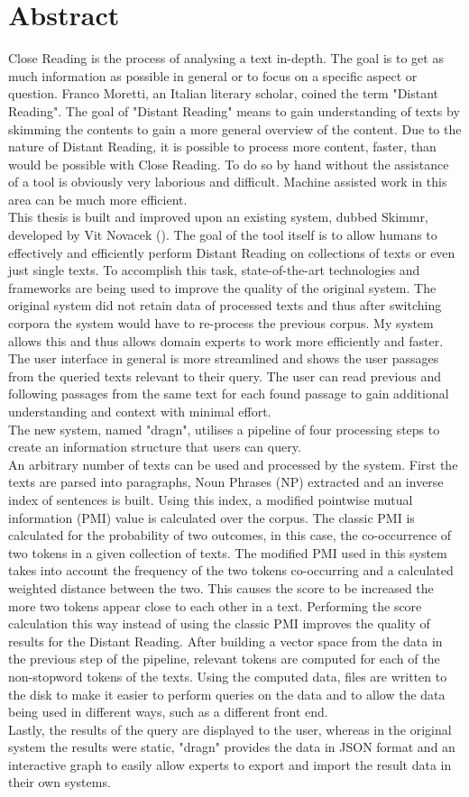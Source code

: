 \section*{Abstract}
Close Reading is the process of analysing a text in-depth. The goal is to get as much information as possible in general or to focus on a specific aspect or question. Franco Moretti, an Italian literary scholar, coined the term "Distant Reading". The goal of "Distant Reading" means to gain understanding of texts by skimming the contents to gain a more general overview of the content. Due to the nature of Distant Reading, it is possible to process more content, faster, than would be possible with Close Reading. To do so by hand without the assistance of a tool is obviously very laborious and difficult. Machine assisted work in this area can be much more efficient.\\
This thesis is built and improved upon an existing system, dubbed Skimmr, developed by Vit Novacek (\cite{novavcek2014skimmr}). The goal of the tool itself is to allow humans to effectively and efficiently perform Distant Reading on collections of texts or even just single texts. To accomplish this task, state-of-the-art technologies and frameworks are being used to improve the quality of the original system. The original system did not retain data of processed texts and thus after switching corpora the system would have to re-process the previous corpus. My system allows this and thus allows domain experts to work more efficiently and faster. The user interface in general is more streamlined and shows the user passages from the queried texts relevant to their query. The user can read previous and following passages from the same text for each found passage to gain additional understanding and context with minimal effort. \\
The new system, named "dragn", utilises a pipeline of four processing steps to create an information structure that users can query. \\
An arbitrary number of texts can be used and processed by the system. First the texts are parsed into paragraphs, Noun Phrases (NP) extracted and an inverse index of sentences is built. Using this index, a modified pointwise mutual information (PMI) value is calculated over the corpus. The classic PMI is calculated for the probability of two outcomes, in this case, the co-occurrence of two tokens in a given collection of texts. The modified PMI used in this system takes into account the frequency of the two tokens co-occurring and a calculated weighted distance between the two. This causes the score to be increased the more two tokens appear close to each other in a text. Performing the score calculation this way instead of using the classic PMI improves the quality of results for the Distant Reading. After building a vector space from the data in the previous step of the pipeline, relevant tokens are computed for each of the non-stopword tokens of the texts. Using the computed data, files are written to the disk to make it easier to perform queries on the data and to allow the data being used in different ways, such as a different front end. \\
Lastly, the results of the query are displayed to the user, whereas in the original system the results were static, "dragn" provides the data in JSON format and an interactive graph to easily allow experts to export and import the result data in their own systems.
